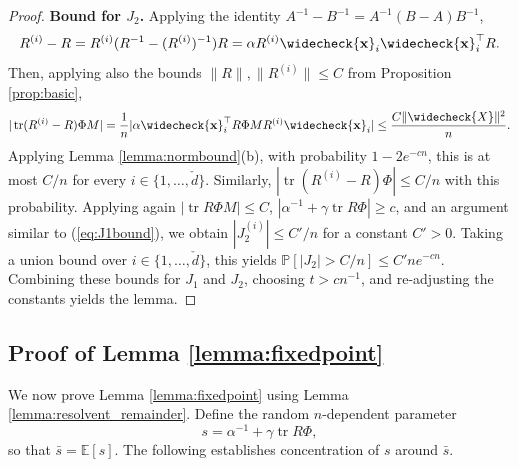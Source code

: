 \documentclass{article}
\theoremstyle{definition}
\newcommand{\E}{\mathbb{E}}
\newcommand{\tr}{\operatorname{tr}}
\newcommand{\vd}{\check{d}}
\newcommand{\vX}{\widecheck{X}}
\renewcommand{\P}{\mathbb{P}}
\newcommand{\vx}{\widecheck{\mathbf{x}}}
\newcommand{\1}{\mathbf{1}}
\begin{document}
\begin{proof}
{\bf Bound for $J_2$.} Applying the identity $A^{-1}-B^{-1}=A^{-1}(B-A)B^{-1}$,
\[R^{(i)}-R=R^{(i)}(R^{-1}-(R^{(i)})^{-1})R=\alpha R^{(i)}\vx_i \vx_i^\top R.\]
Then, applying also the bounds $\|R\|,\|R^{(i)}\| \leq C$ from
Proposition \ref{prop:basic},
\[|\tr (R^{(i)}-R)\Phi M|=\frac{1}{n}|\alpha \vx_i^\top R\Phi MR^{(i)}\vx_i|
\leq \frac{C\|\vX\|^2}{n}.\]
Applying Lemma \ref{lemma:normbound}(b), with probability $1-2e^{-cn}$,
this is at most $C/n$ for every $i \in \{1,\ldots,\vd\}$.
Similarly, $|\tr (R^{(i)}-R)\Phi| \leq C/n$ with this probability.
Applying again
$|\tr R\Phi M| \leq C$, $|\alpha^{-1}+\gamma \tr R\Phi| \geq c$,
and an argument similar to (\ref{eq:J1bound}), we obtain $|J_2^{(i)}| \leq
C'/n$ for a constant $C'>0$. 
Taking a union bound over $i \in \{1,\ldots,\vd\}$, this yields
$\P[|J_2|>C/n] \leq C'ne^{-cn}$.
Combining these bounds for $J_1$ and $J_2$, choosing $t>cn^{-1}$, and
re-adjusting the constants yields the lemma.
\end{proof}

\subsection{Proof of Lemma \ref{lemma:fixedpoint}}

We now prove Lemma \ref{lemma:fixedpoint} using Lemma
\ref{lemma:resolvent_remainder}. Define the random $n$-dependent parameter
\[s=\alpha^{-1}+\gamma \tr R\Phi,\]
so that $\bar{s}=\E[s]$. The following establishes concentration of $s$ around
$\bar{s}$.
\end{document}
